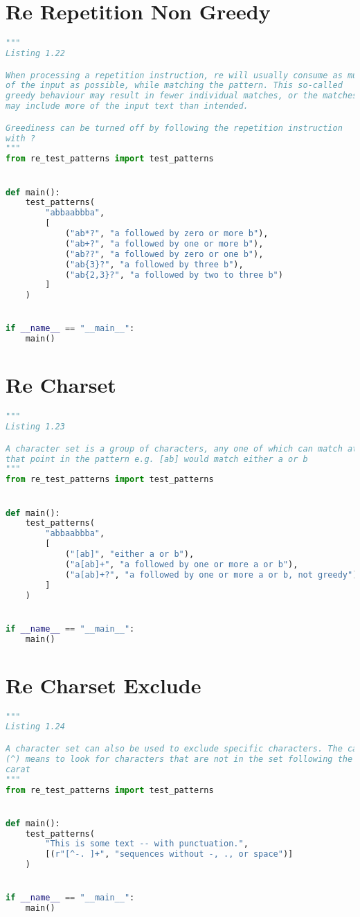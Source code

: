 \documentclass[a4paper,landscape]{report}
\begin{document}
\section{Re Repetition Non Greedy}
\begin{lstlisting}[language=Python]
"""
Listing 1.22

When processing a repetition instruction, re will usually consume as much
of the input as possible, while matching the pattern. This so-called
greedy behaviour may result in fewer individual matches, or the matches
may include more of the input text than intended.

Greediness can be turned off by following the repetition instruction
with ?
"""
from re_test_patterns import test_patterns


def main():
    test_patterns(
        "abbaabbba",
        [
            ("ab*?", "a followed by zero or more b"),
            ("ab+?", "a followed by one or more b"),
            ("ab??", "a followed by zero or one b"),
            ("ab{3}?", "a followed by three b"),
            ("ab{2,3}?", "a followed by two to three b")
        ]
    )


if __name__ == "__main__":
    main()

\end{lstlisting}
\section{Re Charset}
\begin{lstlisting}[language=Python]
"""
Listing 1.23

A character set is a group of characters, any one of which can match at
that point in the pattern e.g. [ab] would match either a or b
"""
from re_test_patterns import test_patterns


def main():
    test_patterns(
        "abbaabbba",
        [
            ("[ab]", "either a or b"),
            ("a[ab]+", "a followed by one or more a or b"),
            ("a[ab]+?", "a followed by one or more a or b, not greedy")
        ]
    )


if __name__ == "__main__":
    main()

\end{lstlisting}
\section{Re Charset Exclude}
\begin{lstlisting}[language=Python]
"""
Listing 1.24

A character set can also be used to exclude specific characters. The carat
(^) means to look for characters that are not in the set following the
carat
"""
from re_test_patterns import test_patterns


def main():
    test_patterns(
        "This is some text -- with punctuation.",
        [(r"[^-. ]+", "sequences without -, ., or space")]
    )


if __name__ == "__main__":
    main()

\end{lstlisting}
\end{document}
